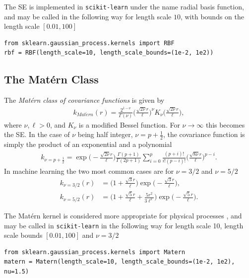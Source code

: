 \documentclass[twoside,english]{uiofysmaster}
\begin{document}
The SE is implemented in \verb|scikit-learn| under the name radial basis function, and may be called in the following way for length scale $10$, with bounds on the length scale $[0.01, 100]$
\begin{lstlisting}
from sklearn.gaussian_process.kernels import RBF
rbf = RBF(length_scale=10, length_scale_bounds=(1e-2, 1e2))
\end{lstlisting}



\subsection{The Mat\'{e}rn Class }

The \textit{Mat\'{e}rn class of covariance functions} is given by
\begin{align}
k_{Mat\acute{e}rn} (r) = \frac{2^{1- \nu}}{\Gamma (\nu)} \Big( \frac{\sqrt{2 \nu} r	}{\ell} \Big)^{\nu} K_{\nu} \Big( \frac{\sqrt{2 \nu}r}{\ell} \Big),
\end{align}
where $\nu, \ell > 0$, and $K_{\nu}$ is a modified Bessel function. For $\nu \rightarrow \infty$ this becomes the SE. In the case of $\nu$ being half integer, $\nu = p + \frac{1}{2}$, the covariance function is simply the product of an exponential and a polynomial
\begin{align}
k_{\nu=p+\frac{1}{2}} = \exp \Big(- \frac{\sqrt{2 \nu} r	}{\ell} \Big) \frac{\Gamma(p+1)}{\Gamma(2p + 1)} \sum^p_{i=0} \frac{(p+i)!}{i!(p-i)!} \Big( \frac{\sqrt{8 \nu} r	}{\ell} \Big)^{p-i}.
\end{align}
In machine learning the two most common cases are for $\nu = 3/2$ and $\nu = 5/2$
\begin{align}
k_{\nu = 3/2}(r) &=  \Big(1 + \frac{\sqrt{3}r}{\ell} \Big) \exp \Big( -\frac{\sqrt{3}r}{\ell} \Big),\\
k_{\nu = 5/2}(r) &=  \Big(1 + \frac{\sqrt{5}r}{\ell}  + \frac{5r^2}{3 \ell^2}\Big) \exp \Big( -\frac{\sqrt{5}r}{\ell} \Big).
\end{align}

The Mat\'{e}rn kernel is considered more appropriate for physical processes \cite{rasmussen2006gaussian}, and may be called in \verb|scikit-learn| in the following way for length scale 10, length scale bounds $[0.01, 100]$ and $\nu = 3/2$
\begin{lstlisting}
from sklearn.gaussian_process.kernels import Matern
matern = Matern(length_scale=10, length_scale_bounds=(1e-2, 1e2), nu=1.5)
\end{lstlisting}
\end{document}
